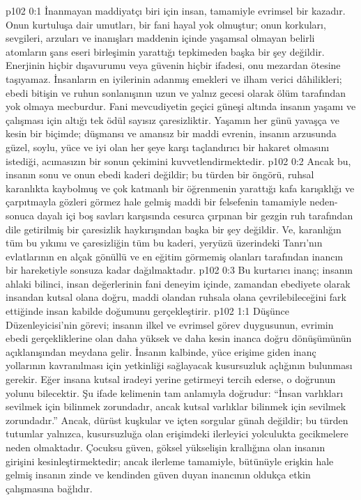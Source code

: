 \vs p102 0:1 İnanmayan maddiyatçı biri için insan, tamamiyle evrimsel bir kazadır. Onun kurtuluşa dair umutları, bir fani hayal yok olmuştur; onun korkuları, sevgileri, arzuları ve inanışları maddenin içinde yaşamsal olmayan belirli atomların şans eseri birleşimin yarattığı tepkimeden başka bir şey değildir. Enerjinin hiçbir dışavurumu veya güvenin hiçbir ifadesi, onu mezardan ötesine taşıyamaz. İnsanların en iyilerinin adanmış emekleri ve ilham verici dâhilikleri; ebedi bitişin ve ruhun sonlanışının uzun ve yalnız gecesi olarak ölüm tarafından yok olmaya mecburdur. Fani mevcudiyetin geçici güneşi altında insanın yaşamı ve çalışması için altığı tek ödül sayısız çaresizliktir. Yaşamın her günü yavaşça ve kesin bir biçimde; düşmansı ve amansız bir maddi evrenin, insanın arzusunda güzel, soylu, yüce ve iyi olan her şeye karşı taçlandırıcı bir hakaret olmasını istediği, acımasızın bir sonun çekimini kuvvetlendirmektedir.
\vs p102 0:2 Ancak bu, insanın sonu ve onun ebedi kaderi değildir; bu türden bir öngörü, ruhsal karanlıkta kaybolmuş ve çok katmanlı bir öğrenmenin yarattığı kafa karışıklığı ve çarpıtmayla gözleri görmez hale gelmiş maddi bir felsefenin tamamiyle neden\hyp{}sonuca dayalı içi boş savları karşısında cesurca çırpınan bir gezgin ruh tarafından dile getirilmiş bir çaresizlik haykırışından başka bir şey değildir. Ve, karanlığın tüm bu yıkımı ve çaresizliğin tüm bu kaderi, yeryüzü üzerindeki Tanrı’nın evlatlarının en alçak gönüllü ve en eğitim görmemiş olanları tarafından inancın bir hareketiyle sonsuza kadar dağılmaktadır.
\vs p102 0:3 Bu kurtarıcı inanç; insanın ahlaki bilinci, insan değerlerinin fani deneyim içinde, zamandan ebediyete olarak insandan kutsal olana doğru, maddi olandan ruhsala olana çevrilebileceğini fark ettiğinde insan kabilde doğumunu gerçekleştirir.
\vs p102 1:1 Düşünce Düzenleyicisi’nin görevi; insanın ilkel ve evrimsel görev duygusunun, evrimin ebedi gerçekliklerine olan daha yüksek ve daha kesin inanca doğru dönüşümünün açıklanışından meydana gelir. İnsanın kalbinde, yüce erişime giden inanç yollarının kavranılması için yetkinliği sağlayacak kusursuzluk açlığının bulunması gerekir. Eğer insana kutsal iradeyi yerine getirmeyi tercih ederse, o doğrunun yolunu bilecektir. Şu ifade kelimenin tam anlamıyla doğrudur: “İnsan varlıkları sevilmek için bilinmek zorundadır, ancak kutsal varlıklar bilinmek için sevilmek zorundadır.” Ancak, dürüst kuşkular ve içten sorgular günah değildir; bu türden tutumlar yalnızca, kusursuzluğa olan erişimdeki ilerleyici yolculukta gecikmelere neden olmaktadır. Çocuksu güven, göksel yükselişin krallığına olan insanın girişini kesinleştirmektedir; ancak ilerleme tamamiyle, bütünüyle erişkin hale gelmiş insanın zinde ve kendinden güven duyan inancının oldukça etkin çalışmasına bağlıdır.
